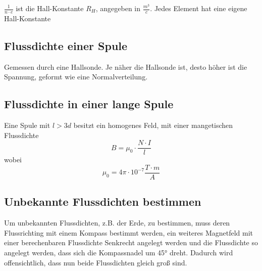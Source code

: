 \documentclass{article}
\begin{document}
\noindent $\frac{1}{n \cdot e}$ ist die Hall-Konstante $R_H$, angegeben in $\frac{m^3}{c}$. Jedes Element hat eine eigene Hall-Konstante
 
\subsection{Flussdichte einer Spule}
Gemessen durch eine Hallsonde. Je näher die Hallsonde ist, desto höher ist die Spannung, geformt wie eine Normalverteilung.
 
\subsection{Flussdichte in einer lange Spule}
Eine Spule mit $l>3d$ besitzt ein homogenes Feld, mit einer mangetischen Flussdichte
\[B=\mu_0 \cdot \frac{N \cdot I}{l}\]
wobei
\[\mu_0 = 4\pi \cdot 10^{-7} \frac{T \cdot m}{A}\]
 
\subsection{Unbekannte Flussdichten bestimmen} 
Um unbekannten Flussdichten, z.B. der Erde, zu bestimmen, muss deren Flussrichting mit einem Kompass bestimmt werden, ein weiteres Magnetfeld mit einer berechenbaren Flussdichte Senkrecht angelegt werden und die Flussdichte so angelegt werden, dass sich die Kompassnadel um 45° dreht. Dadurch wird offensichtlich, dass nun beide Flussdichten gleich groß sind.
 
\end{document}
